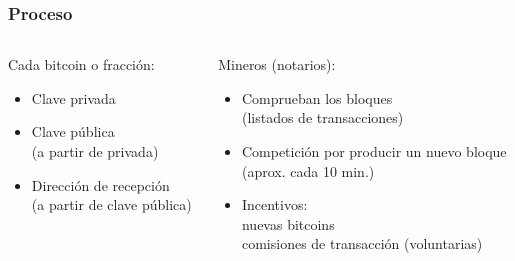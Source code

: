 \begin{frame}
\frametitle{Proceso}

\begin{columns}[T]
\begin{column}{.42\textwidth}
{\Large

Cada bitcoin o fracción:
\begin{itemize}
\item Clave privada
\item Clave pública \\
  (a partir de privada)
\item Dirección de recepción \\
  (a partir de clave pública)
\end{itemize}
}
\end{column}%
\hfill%
\begin{column}{.55\textwidth}
{\Large
Mineros (notarios):
\begin{itemize}
\item Comprueban los bloques \\
  (listados de transacciones)
\item Competición por producir un nuevo bloque \\
  (aprox. cada 10 min.)
\item Incentivos: \\
  nuevas bitcoins \\
  comisiones de transacción (voluntarias)
\end{itemize}
}
\end{column}%
\end{columns}

\end{frame}


